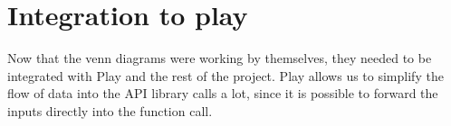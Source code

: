 \section{Integration to play}
Now that the venn diagrams were working by themselves, they needed to be integrated with Play and the rest of the project. Play allows us to simplify the flow of data into the API library calls a lot, since it is possible to forward the inputs directly into the function call.
